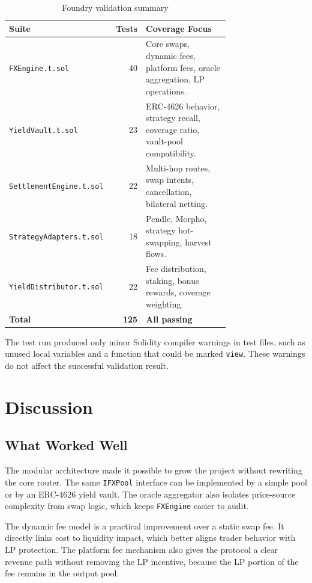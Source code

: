 \documentclass{article}
\begin{document}
\begin{table}[h]
\centering
\begin{tabular}{p{0.35\linewidth} r p{0.38\linewidth}}
\toprule
\textbf{Suite} & \textbf{Tests} & \textbf{Coverage Focus} \\
\midrule
\texttt{FXEngine.t.sol} & 40 & Core swaps, dynamic fees, platform fees, oracle aggregation, LP operations. \\
\texttt{YieldVault.t.sol} & 23 & ERC-4626 behavior, strategy recall, coverage ratio, vault-pool compatibility. \\
\texttt{SettlementEngine.t.sol} & 22 & Multi-hop routes, swap intents, cancellation, bilateral netting. \\
\texttt{StrategyAdapters.t.sol} & 18 & Pendle, Morpho, strategy hot-swapping, harvest flows. \\
\texttt{YieldDistributor.t.sol} & 22 & Fee distribution, staking, bonus rewards, coverage weighting. \\
\midrule
\textbf{Total} & \textbf{125} & \textbf{All passing} \\
\bottomrule
\end{tabular}
\caption{Foundry validation summary}
\end{table}

The test run produced only minor Solidity compiler warnings in test files, such as unused local variables and a function that could be marked \texttt{view}. These warnings do not affect the successful validation result.

\section{Discussion}

\subsection{What Worked Well}

The modular architecture made it possible to grow the project without rewriting the core router. The same \texttt{IFXPool} interface can be implemented by a simple pool or by an ERC-4626 yield vault. The oracle aggregator also isolates price-source complexity from swap logic, which keeps \texttt{FXEngine} easier to audit.

The dynamic fee model is a practical improvement over a static swap fee. It directly links cost to liquidity impact, which better aligns trader behavior with LP protection. The platform fee mechanism also gives the protocol a clear revenue path without removing the LP incentive, because the LP portion of the fee remains in the output pool.
\end{document}
